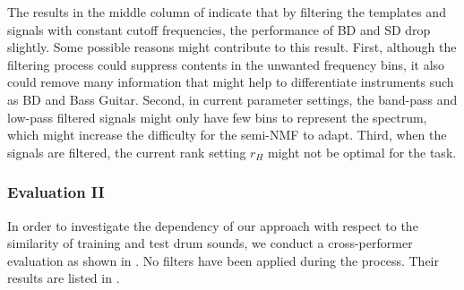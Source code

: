 \documentclass{article}
\begin{document}
The results in the middle column of  indicate that by filtering the templates and signals with constant cutoff frequencies, the performance of BD and SD drop slightly.	Some possible reasons might contribute to this result. First, although the filtering process could suppress contents in the unwanted frequency bins, it also could remove many information that might help to differentiate instruments such as BD and Bass Guitar. Second, in current parameter settings, the band-pass and low-pass filtered signals might only have few bins to represent the spectrum, which might increase the difficulty for the semi-NMF to adapt. Third, when the signals are filtered, the current rank setting $r_H$ might not be optimal for the task.  

%
%
%


\subsubsection{Evaluation II}

In order to investigate the dependency of our approach with respect to the similarity of training and test drum sounds, we conduct a cross-performer evaluation as shown in . No filters have been applied during the process. Their results are listed in .
\end{document}
